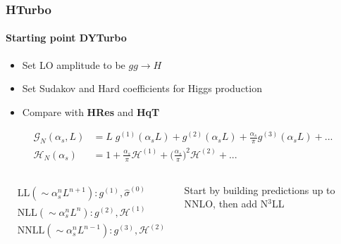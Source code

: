 \documentclass[aspectratio=43]{beamer}
\begin{document}
\begin{frame}

	\frametitle{HTurbo}
	\framesubtitle{Starting point DYTurbo}
	
	\begin{itemize}
		\item Set LO amplitude to be $gg \rightarrow H$
		\item Set Sudakov and Hard coefficients for Higgs production
		\item Compare with \textbf{HRes} and \textbf{HqT}
	\end{itemize}
	
	\begin{align}
		\mathcal{G}_{N}(\alpha_{s}, L) &= L\;g^{(1)}(\alpha_{s}L) + g^{(2)}(\alpha_{s}L) + \frac{\alpha_{s}}{\pi}g^{(3)}(\alpha_{s}L) + ... \nonumber \\
		\mathcal{H}_{N}(\alpha_{s}) &= 1 + \frac{\alpha_{s}}{\pi}\mathcal{H}^{(1)} + \Big(\frac{\alpha_{s}}{\pi}\Big)^{2}\mathcal{H}^{(2)} + ...  \nonumber
	\end{align}
	
	\begin{columns}
		

		\begin{align}
			&\textrm{LL} (\sim \alpha_{s}^{n}L^{n+1}): g^{(1)}, \hat{\sigma}^{(0)} \nonumber \\
			&\textrm{NLL} (\sim \alpha_{s}^{n}L^{n}): g^{(2)}, \mathcal{H}^{(1)} \nonumber \\
			&\textrm{NNLL} (\sim \alpha_{s}^{n}L^{n-1}): g^{(3)}, \mathcal{H}^{(2)} \nonumber
		\end{align}
	
		
		Start by building predictions up to NNLO, then add {\color{blue}N$^{3}$LL}
		
	\end{columns}

\end{frame}
\end{document}
